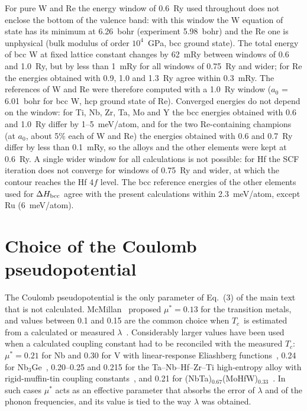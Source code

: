 \documentclass[aps,prb,preprint,superscriptaddress,floatfix]{revtex4-2}
\newcommand{\Tc}{$T_c$}
\begin{document}
For pure W and Re the energy window of 0.6~Ry used throughout does not enclose the bottom of
the valence band: with this window the W equation of state has its minimum at 6.26~bohr
(experiment 5.98~bohr) and the Re one is unphysical (bulk modulus of order $10^4$~GPa, bcc
ground state). The total energy of bcc W at fixed lattice constant changes by 62~mRy between
windows of 0.6 and 1.0~Ry, but by less than 1~mRy for all windows of 0.75~Ry and wider; for Re
the energies obtained with 0.9, 1.0 and 1.3~Ry agree within 0.3~mRy. The references of W and Re
were therefore computed with a 1.0~Ry window ($a_0$ = 6.01~bohr for bcc W, hcp ground state of
Re). Converged energies do not depend on the window: for Ti, Nb, Zr, Ta, Mo and Y the bcc
energies obtained with 0.6 and 1.0~Ry differ by 1--5~meV/atom, and for the two Re-containing
champions (at $a_0$, about 5\% each of W and Re) the energies obtained with 0.6 and 0.7~Ry
differ by less than 0.1~mRy, so the alloys and the other elements were kept at 0.6~Ry. A single
wider window for all calculations is not possible: for Hf the SCF iteration does not converge
for windows of 0.75~Ry and wider, at which the contour reaches the Hf 4$f$ level. The bcc
reference energies of the other elements used for $\Delta H_{\rm bcc}$ agree with the present
calculations within 2.3~meV/atom, except Ru (6~meV/atom).

\clearpage
\section{Choice of the Coulomb pseudopotential}
\label{sec:mustar}

The Coulomb pseudopotential is the only parameter of Eq.~(3) of the main text that is not
calculated. McMillan~\cite{McMillan1968} proposed $\mu^* = 0.13$ for the transition metals, and
values between 0.1 and 0.15 are the common choice when \Tc\ is estimated from a calculated
or measured $\lambda$~\cite{McMillan1968,AllenDynes1975,lit_Idczak_16175814,lit_Idczak_fnz7bzmw}.
Considerably larger values have been used when a calculated coupling constant had to be
reconciled with the measured \Tc: $\mu^* = 0.21$ for Nb and 0.30 for V with
linear-response Eliashberg functions~\cite{Savrasov1996}, 0.24 for
Nb$_3$Ge~\cite{Carbotte1990}, 0.20--0.25 and 0.215 for the Ta--Nb--Hf--Zr--Ti
high-entropy alloy with rigid-muffin-tin coupling
constants~\cite{Jaskiewicz2016,Jaskiewicz2019}, and 0.21 for
(NbTa)$_{0.67}$(MoHfW)$_{0.33}$~\cite{lit_Sobota_06184512}. In such cases $\mu^*$ acts as an
effective parameter that absorbs the error of $\lambda$ and of the phonon frequencies, and
its value is tied to the way $\lambda$ was obtained.
\end{document}
